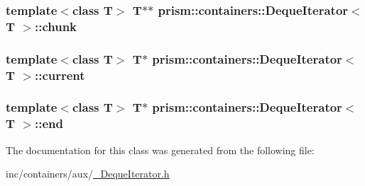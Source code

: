 \subsubsection[{\texorpdfstring{chunk}{chunk}}]{\setlength{\rightskip}{0pt plus 5cm}template$<$class T$>$ T$\ast$$\ast$ {\bf prism\+::containers\+::\+Deque\+Iterator}$<$ T $>$\+::chunk}\hypertarget{classprism_1_1containers_1_1_deque_iterator_abcea24c7a08e5ccb4b29234a1415a1ef}{}\label{classprism_1_1containers_1_1_deque_iterator_abcea24c7a08e5ccb4b29234a1415a1ef}
\subsubsection[{\texorpdfstring{current}{current}}]{\setlength{\rightskip}{0pt plus 5cm}template$<$class T$>$ T$\ast$ {\bf prism\+::containers\+::\+Deque\+Iterator}$<$ T $>$\+::current}\hypertarget{classprism_1_1containers_1_1_deque_iterator_a3a039e4ee4509c1fd26242d198b0050d}{}\label{classprism_1_1containers_1_1_deque_iterator_a3a039e4ee4509c1fd26242d198b0050d}
\subsubsection[{\texorpdfstring{end}{end}}]{\setlength{\rightskip}{0pt plus 5cm}template$<$class T$>$ T$\ast$ {\bf prism\+::containers\+::\+Deque\+Iterator}$<$ T $>$\+::end}\hypertarget{classprism_1_1containers_1_1_deque_iterator_a7666f12e4942b4775b0861a4515f7f0e}{}\label{classprism_1_1containers_1_1_deque_iterator_a7666f12e4942b4775b0861a4515f7f0e}


The documentation for this class was generated from the following file\+:\begin{DoxyCompactItemize}
\item 
inc/containers/aux/\hyperlink{___deque_iterator_8h}{\+\_\+\+Deque\+Iterator.\+h}\end{DoxyCompactItemize}
